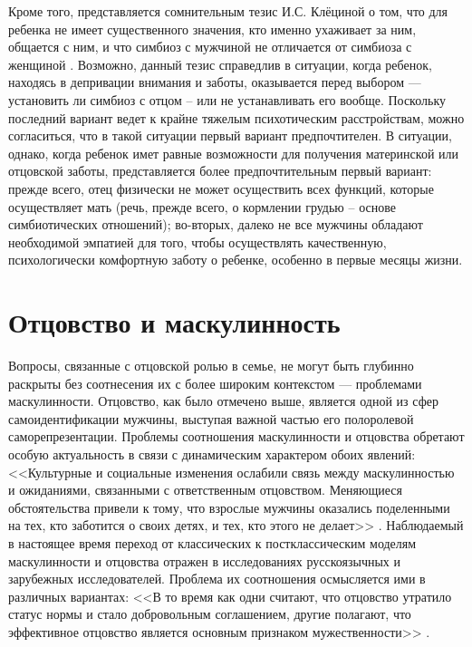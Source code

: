 \documentclass{../../common/thesisbyxetex}
\begin{document}
Кроме того, представляется сомнительным тезис И.С. Клёциной о том, что для ребенка не имеет
существенного значения, кто именно ухаживает за ним, общается с ним, и что симбиоз с мужчиной не
отличается от симбиоза с женщиной \cite{clec}. Возможно, данный тезис справедлив в ситуации, когда
ребенок, находясь в депривации внимания и заботы, оказывается перед выбором --- установить ли
симбиоз с отцом -- или не устанавливать его вообще. Поскольку последний вариант ведет к крайне
тяжелым психотическим расстройствам, можно согласиться, что в такой ситуации первый вариант
предпочтителен. В ситуации, однако, когда ребенок имет равные возможности для получения материнской
или отцовской заботы, представляется более предпочтительным первый вариант: прежде всего, отец
физически не может осуществить всех функций, которые осуществляет мать (речь, прежде всего, о
кормлении грудью -- основе симбиотических отношений); во-вторых, далеко не все мужчины обладают
необходимой эмпатией для того, чтобы осуществлять качественную, психологически комфортную заботу о
ребенке, особенно в первые месяцы жизни.


\section{Отцовство и маскулинность}

Вопросы, связанные с отцовской ролью в семье, не могут быть глубинно раскрыты без
соотнесения их с более широким контекстом --- проблемами маскулинности. Отцовство, как было
отмечено выше, является одной из сфер самоидентификации мужчины, выступая
важной частью его полоролевой саморепрезентации. Проблемы соотношения маскулинности и отцовства
обретают особую актуальность в связи с динамическим характером обоих явлений: <<Культурные и
социальные изменения ослабили связь между маскулинностью и ожиданиями, связанными с ответственным
отцовством. Меняющиеся обстоятельства привели к тому, что взрослые мужчины оказались поделенными
на тех, кто заботится о своих детях, и тех, кто этого не делает>> \cite[132]{f21}. Наблюдаемый в
настоящее время переход от классических к постклассическим моделям маскулинности и отцовства
отражен в исследованиях русскоязычных и зарубежных исследователей. Проблема их соотношения
осмысляется ими в различных вариантах: <<В то время как одни считают, что отцовство утратило
статус нормы и стало добровольным соглашением, другие полагают, что эффективное отцовство является
основным признаком мужественности>> \cite[132]{f21}.
\end{document}
